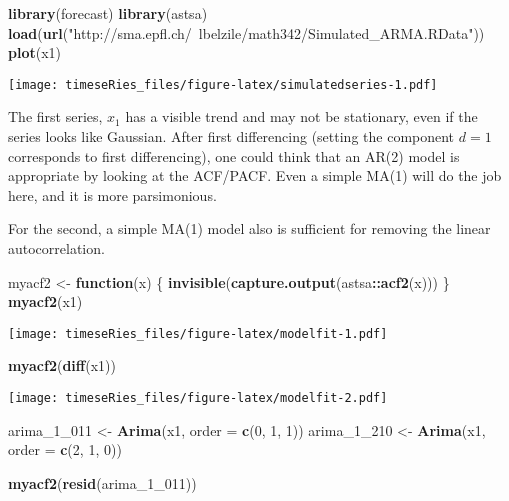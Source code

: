 \documentclass[]{book}
\newenvironment{Shaded}{\begin{snugshade}}{\end{snugshade}}
\newcommand{\KeywordTok}[1]{\textcolor[rgb]{0.13,0.29,0.53}{\textbf{#1}}}
\newcommand{\DataTypeTok}[1]{\textcolor[rgb]{0.13,0.29,0.53}{#1}}
\newcommand{\DecValTok}[1]{\textcolor[rgb]{0.00,0.00,0.81}{#1}}
\newcommand{\StringTok}[1]{\textcolor[rgb]{0.31,0.60,0.02}{#1}}
\newcommand{\ControlFlowTok}[1]{\textcolor[rgb]{0.13,0.29,0.53}{\textbf{#1}}}
\newcommand{\OperatorTok}[1]{\textcolor[rgb]{0.81,0.36,0.00}{\textbf{#1}}}
\newcommand{\NormalTok}[1]{#1}
\begin{document}
\begin{Shaded}
\begin{Highlighting}[]
\KeywordTok{library}\NormalTok{(forecast)}
\KeywordTok{library}\NormalTok{(astsa)}
\KeywordTok{load}\NormalTok{(}\KeywordTok{url}\NormalTok{(}\StringTok{"http://sma.epfl.ch/~lbelzile/math342/Simulated_ARMA.RData"}\NormalTok{))}
\KeywordTok{plot}\NormalTok{(x1)}
\end{Highlighting}
\end{Shaded}

\texttt{[image: timeseRies\_files/figure-latex/simulatedseries-1.pdf]}

The first series, \(x_1\) has a visible trend and may not be stationary,
even if the series looks like Gaussian. After first differencing
(setting the component \(d=1\) corresponds to first differencing), one
could think that an AR(2) model is appropriate by looking at the
ACF/PACF. Even a simple MA(1) will do the job here, and it is more
parsimonious.

For the second, a simple MA(1) model also is sufficient for removing the
linear autocorrelation.

\begin{Shaded}
\begin{Highlighting}[]
\NormalTok{myacf2 <-}\StringTok{ }\ControlFlowTok{function}\NormalTok{(x) \{}
    \KeywordTok{invisible}\NormalTok{(}\KeywordTok{capture.output}\NormalTok{(astsa}\OperatorTok{::}\KeywordTok{acf2}\NormalTok{(x)))}
\NormalTok{\}}
\KeywordTok{myacf2}\NormalTok{(x1)}
\end{Highlighting}
\end{Shaded}

\texttt{[image: timeseRies\_files/figure-latex/modelfit-1.pdf]}

\begin{Shaded}
\begin{Highlighting}[]
\KeywordTok{myacf2}\NormalTok{(}\KeywordTok{diff}\NormalTok{(x1))}
\end{Highlighting}
\end{Shaded}

\texttt{[image: timeseRies\_files/figure-latex/modelfit-2.pdf]}

\begin{Shaded}
\begin{Highlighting}[]
\NormalTok{arima_1_}\DecValTok{011}\NormalTok{ <-}\StringTok{ }\KeywordTok{Arima}\NormalTok{(x1, }\DataTypeTok{order =} \KeywordTok{c}\NormalTok{(}\DecValTok{0}\NormalTok{, }\DecValTok{1}\NormalTok{, }\DecValTok{1}\NormalTok{))}
\NormalTok{arima_1_}\DecValTok{210}\NormalTok{ <-}\StringTok{ }\KeywordTok{Arima}\NormalTok{(x1, }\DataTypeTok{order =} \KeywordTok{c}\NormalTok{(}\DecValTok{2}\NormalTok{, }\DecValTok{1}\NormalTok{, }\DecValTok{0}\NormalTok{))}

\KeywordTok{myacf2}\NormalTok{(}\KeywordTok{resid}\NormalTok{(arima_1_}\DecValTok{011}\NormalTok{))}
\end{Highlighting}
\end{Shaded}
\end{document}
